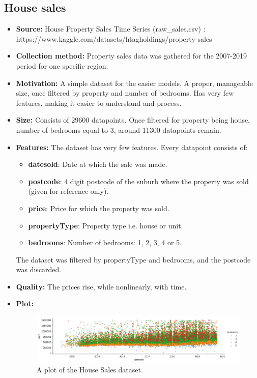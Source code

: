 \subsection{House sales}
\begin{itemize}
	\item \textbf{Source:} House Property Sales Time Series (raw\_sales.csv) :\\ https://www.kaggle.com/datasets/htagholdings/property-sales
	\item \textbf{Collection method:} Property sales data was gathered for the 2007-2019 period for one specific region.
	\item \textbf{Motivation:} A simple dataset for the easier models. A proper, manageable size, once filtered by property and number of bedrooms. Has very few features, making it easier to understand and process.
	\item \textbf{Size:} Consists of 29600 datapoints. Once filtered for property being house, number of bedrooms equal to 3, around 11300 datapoints remain.
	\item \textbf{Features:} The dataset has very few features. Every datapoint consists of:
	      \begin{itemize}
		      \item \textbf{datesold}: Date at which the sale was made.
		      \item \textbf{postcode}: 4 digit postcode of the suburb where the property was sold (given for reference only).
		      \item \textbf{price}: Price for which the property was sold.
		      \item \textbf{propertyType}: Property type i.e. house or unit.
		      \item \textbf{bedrooms}: Number of bedrooms: 1, 2, 3, 4 or 5.
	      \end{itemize}
	      The dataset was filtered by propertyType and bedrooms, and the postcode was discarded.
	\item \textbf{Quality:} The prices rise, while nonlinearly, with time.
	\item \textbf{Plot:}
	      \begin{figure}[h!]
		      \includegraphics[width=\linewidth]{"pictures/house_sales_graph.png"}
		      \caption{A plot of the House Sales dataset.}
		      \label{fig:house_sales_graph}
	      \end{figure}
\end{itemize}
